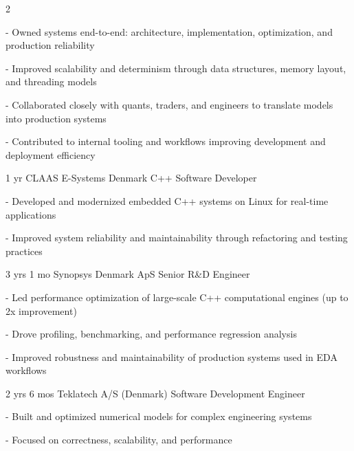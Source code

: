 \documentclass[11pt]{article} %
\begin{document}
\begin{paracol}{2}
{- Owned systems end-to-end: architecture, implementation, optimization, and production reliability

- Improved scalability and determinism through data structures, memory layout, and threading models

- Collaborated closely with quants, traders, and engineers to translate models into production systems

- Contributed to internal tooling and workflows improving development and deployment efficiency
} %


{1 yr} %
{CLAAS E-Systems Denmark} %
{C++ Software Developer} %
{- Developed and modernized embedded C++ systems on Linux for real-time applications

- Improved system reliability and maintainability through refactoring and testing practices
} %

{3 yrs 1 mo} %
{Synopsys Denmark ApS} %
{Senior R\&D Engineer} %
{- Led performance optimization of large-scale C++ computational engines (up to 2x improvement)

- Drove profiling, benchmarking, and performance regression analysis

- Improved robustness and maintainability of production systems used in EDA workflows
} %


\switchcolumn %


{2 yrs 6 mos} %
{Teklatech A/S (Denmark)} %
{Software Development Engineer} %
{- Built and optimized numerical models for complex engineering systems

- Focused on correctness, scalability, and performance
}  %





\end{paracol}
\end{document}
